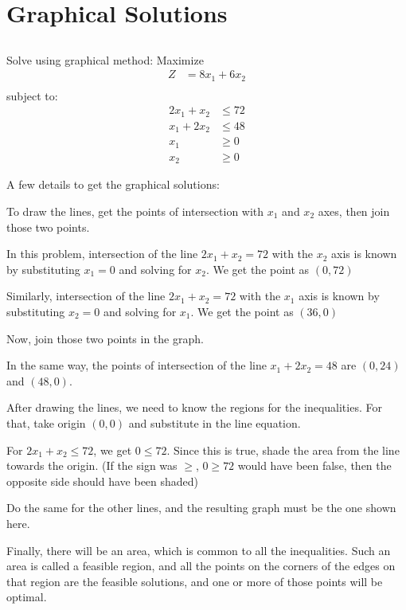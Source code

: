 \documentclass[12pt]{article}
\begin{document}
\section{Graphical Solutions}
\label{sec-2}
\subsection{}

Solve using graphical method:
Maximize 
\begin{align*}
Z           & = 8 x_1 + 6 x_2 \\
\end{align*}
subject to:
\begin{align*}
2 x_1 + x_2 & \le 72          \\
x_1 + 2 x_2 & \le 48          \\
x_1         & \ge 0           \\
x_2         & \ge 0
\end{align*}

A few details to get the graphical solutions:

To draw the lines, get the points of intersection with $x_1$ and $x_2$ axes, then join those two points. 

In this problem, intersection of the line $2 x_1+x_2 = 72$ with the $x_2$ axis is known by substituting $x_1=0$ and solving for $x_2$.
We get the point as $(0,72)$

Similarly,  intersection of the line $2 x_1+x_2 = 72$ with the $x_1$ axis is known by substituting $x_2=0$ and solving for $x_1$.
We get the point as $(36,0)$

Now, join those two points in the graph.

In the same way, the points of intersection of the line $x_1+2 x_2 = 48$ are $(0,24)$ and $(48,0)$.

After drawing the lines, we need to know the regions for the inequalities. For that, take origin $(0,0)$ and substitute in the line equation.

For $2 x_1+x_2\le 72$, we get $0\le 72$. Since this is true, shade the area from the line towards the origin. (If the sign was $\ge$, $0\ge 72$ would have been false, then the opposite side should have been shaded)

Do the same for the other lines, and the resulting graph must be the one shown here.

Finally, there will be an area, which is common to all the inequalities. Such an area is called a feasible region, and all the points on the corners of the edges on that region are the feasible solutions, and one or more of those points will be optimal. 
\end{document}
